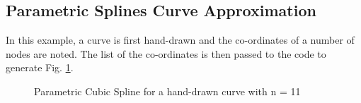 \documentclass[11pt]{article}
\begin{document}
\subsection{Parametric Splines Curve Approximation}

In this example, a curve is first hand-drawn and the co-ordinates of a number of nodes are noted. The list of the co-ordinates is then passed to the code to generate Fig. \ref{fig:curve}. 

\begin{figure}
     \centering
    		 {}
     \caption{Parametric Cubic Spline for a hand-drawn curve with n = 11}
     \label{fig:curve}
\end{figure}

%
%
%
%
%
%
\end{document}
